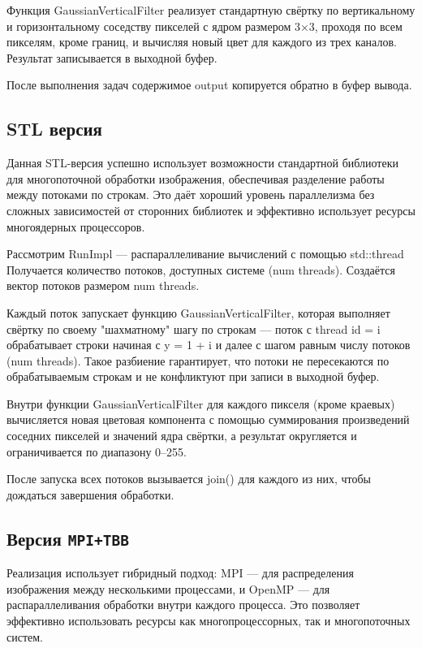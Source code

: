 \documentclass[12pt]{article}
\begin{document}
Функция GaussianVerticalFilter реализует стандартную свёртку по вертикальному и горизонтальному соседству пикселей с ядром размером 3×3, проходя по всем пикселям, кроме границ, и вычисляя новый цвет для каждого из трех каналов. Результат записывается в выходной буфер.

После выполнения задач содержимое output копируется обратно в буфер вывода.


\subsection{STL версия}

Данная STL-версия успешно использует возможности стандартной библиотеки для многопоточной обработки изображения, обеспечивая разделение работы между потоками по строкам. Это даёт хороший уровень параллелизма без сложных зависимостей от сторонних библиотек и эффективно использует ресурсы многоядерных процессоров. 

Рассмотрим RunImpl — распараллеливание вычислений с помощью std::thread
Получается количество потоков, доступных системе (num threads). Создаётся вектор потоков размером num threads.

Каждый поток запускает функцию GaussianVerticalFilter, которая выполняет свёртку по своему "шахматному" шагу по строкам — поток с thread id = i обрабатывает строки начиная с y = 1 + i и далее с шагом равным числу потоков (num threads). Такое разбиение гарантирует, что потоки не пересекаются по обрабатываемым строкам и не конфликтуют при записи в выходной буфер.

Внутри функции GaussianVerticalFilter для каждого пикселя (кроме краевых) вычисляется новая цветовая компонента с помощью суммирования произведений соседних пикселей и значений ядра свёртки, а результат округляется и ограничивается по диапазону 0–255.

После запуска всех потоков вызывается join() для каждого из них, чтобы дождаться завершения обработки.


\subsection{Версия \texttt{MPI+TBB}}

Реализация использует гибридный подход: MPI — для распределения изображения между несколькими процессами, и OpenMP — для распараллеливания обработки внутри каждого процесса. Это позволяет эффективно использовать ресурсы как многопроцессорных, так и многопоточных систем.
\end{document}
